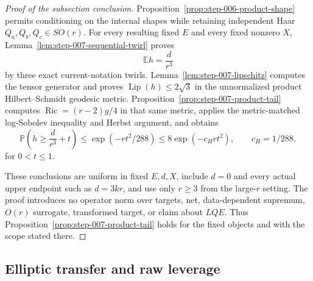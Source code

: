 \begin{proof}[Proof of the subsection conclusion]

Proposition~\ref{prop:step-006-product-shape} permits conditioning
on the internal shapes while retaining independent Haar
\(Q_a,Q_b,Q_c\in SO(r)\). For every resulting fixed \(E\) and every fixed
nonzero \(X\), Lemma~\ref{lem:step-007-sequential-twirl} proves
\[
  \mathbb Eh=\frac d{r^3}
\]
by three exact current-notation twirls. Lemma~\ref{lem:step-007-lipschitz}
computes the tensor generator and proves
\(\operatorname{Lip}(h)\le2\sqrt3\) in the unnormalized product
Hilbert--Schmidt geodesic metric. Proposition~\ref{prop:step-007-product-tail}
computes \(\operatorname{Ric}=(r-2)g/4\) in that same metric, applies the
metric-matched log-Sobolev inequality and Herbst argument, and obtains
\[
  \mathbb P\!\left(h\ge\frac d{r^3}+t\right)
  \le\exp(-rt^2/288)
  \le8\exp(-c_Hrt^2),
  \qquad c_H=1/288,
\]
for \(0<t\le1\).

These conclusions are uniform in fixed \(E,d,X\), include \(d=0\) and every
actual upper endpoint such as \(d=3kr\), and use only \(r\ge3\) from the
large-\(r\) setting. The proof introduces no operator norm over targets, net,
data-dependent supremum, \(O(r)\) surrogate, transformed target, or claim
about \(LQE\). Thus Proposition~\ref{prop:step-007-product-tail} holds for
the fixed objects and with the scope stated there.

\end{proof}

\subsection{Elliptic transfer and raw leverage}\label{app:step-008}

